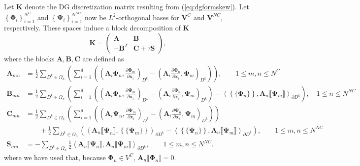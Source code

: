 \documentclass[preprint,10pt]{elsarticle}
\newcommand{\pd}[2]{\frac{\partial#1}{\partial#2}}
\newcommand{\LRp}[1]{\left( #1 \right)}
\newcommand{\LRa}[1]{\left\langle #1 \right\rangle}
\newcommand{\LRc}[1]{\left\{ #1 \right\}}
\newcommand{\jump}[1] {\ensuremath{\llbracket#1\rrbracket}}
\newcommand{\avg}[1] {\ensuremath{\LRc{\!\{#1\}\!}}}
\newcommand{\Oh}{\Omega_h}
\newcommand{\note}[1]{{\color{blue}#1}}
\begin{document}
Let $\bm{K}$ denote the DG discretization matrix resulting from (\ref{eq:dgformskew}).  Let $\LRc{\bm{\Phi}_i }_{i=1}^{N^{C}}$ and $\LRc{\bm{\Psi}_i }_{i=1}^{N^{NC}}$ now be $L^2$-orthogonal bases for $\bm{V}^C$ and $\bm{V}^{NC}$, respectively.  These spaces induce a block decomposition of $\bm{K}$
\begin{equation}
\bm{K} = \left(\begin{array}{cc}
\bm{A} & \bm{B}\\
-{\bm{B}}^T & \bm{C} + \tau \bm{S}
\end{array}\right),
\label{eq:block}
\end{equation}
\note{
where the blocks $\bm{A},\bm{B},\bm{C}$ are defined as
\begin{align*}
\bm{A}_{mn} &= \frac{1}{2}\sum_{D^k\in \Oh} \LRp{ \sum_{i=1}^d\LRp{\LRp{\bm{A}_i\bm{\Phi}_n, \pd{\bm{\Phi}_m}{\bm{x}_i}}_{D^k} - \LRp{\bm{A}_i \pd{\bm{\Phi}_n}{\bm{x}_i}, {\bm{\Phi}_m}}_{D^k}}}, \qquad 1\leq m,n \leq N^C\\
\bm{B}_{mn} &= \frac{1}{2}\sum_{D^k\in \Oh} \LRp{ \sum_{i=1}^d\LRp{\LRp{\bm{A}_i\bm{\Phi}_n, \pd{\bm{\Psi}_m}{\bm{x}_i}}_{D^k} - \LRp{\bm{A}_i \pd{\bm{\Phi}_n}{\bm{x}_i}, {\bm{\Psi}_m}}_{D^k}} - {\LRa{\avg{\bm{\Phi}_n}, \bm{A}_n\jump{\bm{\Psi}_m}}_{\partial D^k}} }, \quad 1\leq n \leq N^{NC} \\
\bm{C}_{mn}  &=  \frac{1}{2}\sum_{D^k\in \Oh}\LRp{
\sum_{i=1}^d\LRp{\LRp{\bm{A}_i\bm{\Psi}_n, \pd{\bm{\Psi}_m}{\bm{x}_i}}_{D^k} - \LRp{\bm{A}_i \pd{\bm{\Psi}_n}{\bm{x}_i}, {\bm{\Psi}_m}}_{D^k}}}\\
&\qquad + \frac{1}{2}\sum_{D^k\in \Oh}\LRp{\LRa{\bm{A}_n\jump{\bm{\Psi}_n}, \avg{\bm{\Psi}_m}}_{\partial D^k}-\LRa{\avg{\bm{\Psi}_n}, \bm{A}_n\jump{\bm{\Psi}_m}}_{\partial D^k}}, \qquad 1 \leq m,n \leq N^{NC}\\
\bm{S}_{mn}  &= -\sum_{D^k\in \Oh}  \frac{1}{2}\LRa{\bm{A}_n\jump{\bm{\Psi}_n},\bm{A}_n\jump{\bm{\Psi}_m}}_{\partial D^k}, \qquad 1 \leq m,n \leq N^{NC}.  
\end{align*}
where we have used that, because $\bm{\Phi}_n\in V^{C}$, $\bm{A}_n\jump{\bm{\Phi}_n} = 0$.}
\end{document}
